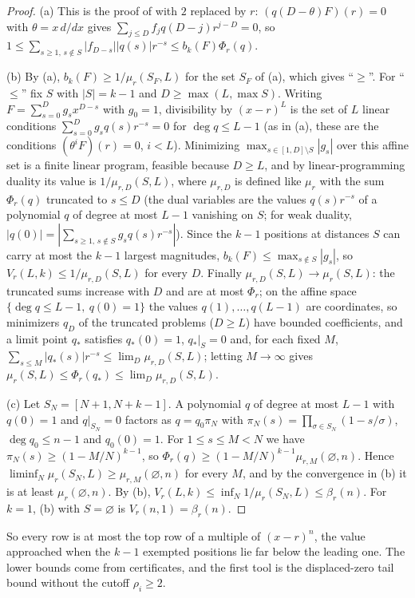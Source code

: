 \documentclass[11pt]{article}
\begin{document}
\begin{proof}
(a) This is the proof of \cite[Lemma~4.5]{coefficient-mass} with $2$ replaced by $r$:
$(q(D-\theta)F)(r)=0$ with $\theta=x\,d/dx$ gives
$\sum_{j\le D}f_jq(D-j)r^{j-D}=0$, so
$1\le\sum_{s\ge1,\,s\notin S}|f_{D-s}||q(s)|r^{-s}\le b_k(F)\Phi_r(q)$.

(b) By (a), $b_k(F)\ge1/\mu_r(S_F,L)$ for the set $S_F$ of (a), which
gives ``$\ge$''.  For ``$\le$'' fix $S$ with $|S|=k-1$ and $D\ge\max(L,\max S)$.
Writing $F=\sum_{s=0}^Dg_sx^{D-s}$ with $g_0=1$, divisibility by
$(x-r)^L$ is the set of $L$ linear conditions
$\sum_{s=0}^Dg_sq(s)r^{-s}=0$ for $\deg q\le L-1$ (as in (a), these are the
conditions $(\theta^iF)(r)=0$, $i<L$).  Minimizing
$\max_{s\in[1,D]\setminus S}|g_s|$ over this affine set is a finite linear
program, feasible because $D\ge L$, and by linear-programming duality its value is
$1/\mu_{r,D}(S,L)$, where $\mu_{r,D}$ is defined like $\mu_r$ with the sum
$\Phi_r(q)$ truncated to $s\le D$ (the dual variables are the values
$q(s)r^{-s}$ of a polynomial $q$ of degree at most $L-1$ vanishing on $S$;
for weak duality, $|q(0)|=|\sum_{s\ge1,\,s\notin S}g_sq(s)r^{-s}|$).  Since
the $k-1$ positions at distances $S$ can carry at most the $k-1$ largest
magnitudes, $b_k(F)\le\max_{s\notin S}|g_s|$, so
$V_r(L,k)\le1/\mu_{r,D}(S,L)$ for every $D$.  Finally
$\mu_{r,D}(S,L)\to\mu_r(S,L)$: the truncated sums increase with $D$ and
are at most $\Phi_r$; on the affine space $\{\deg q\le L-1,\ q(0)=1\}$ the
values $q(1),\ldots,q(L-1)$ are coordinates, so minimizers $q_D$ of the
truncated problems ($D\ge L$) have bounded coefficients, and a limit point
$q_*$ satisfies $q_*(0)=1$, $q_*|_S=0$ and, for each fixed $M$,
$\sum_{s\le M}|q_*(s)|r^{-s}\le\lim_D\mu_{r,D}(S,L)$; letting $M\to\infty$
gives $\mu_r(S,L)\le\Phi_r(q_*)\le\lim_D\mu_{r,D}(S,L)$.

(c) Let $S_N=[N+1,N+k-1]$.  A polynomial $q$ of degree at most $L-1$ with
$q(0)=1$ and $q|_{S_N}=0$ factors as $q=q_0\pi_N$ with
$\pi_N(s)=\prod_{\sigma\in S_N}(1-s/\sigma)$, $\deg q_0\le n-1$ and
$q_0(0)=1$.  For $1\le s\le M<N$ we have $\pi_N(s)\ge(1-M/N)^{k-1}$, so
$\Phi_r(q)\ge(1-M/N)^{k-1}\mu_{r,M}(\varnothing,n)$.  Hence
$\liminf_N\mu_r(S_N,L)\ge\mu_{r,M}(\varnothing,n)$ for every $M$, and by
the convergence in (b) it is at least $\mu_r(\varnothing,n)$.  By (b),
$V_r(L,k)\le\inf_N1/\mu_r(S_N,L)\le\beta_r(n)$.  For $k=1$, (b) with
$S=\varnothing$ is $V_r(n,1)=\beta_r(n)$.
\end{proof}

So every row is at most the top row of a multiple of $(x-r)^n$, the value
approached when the $k-1$ exempted positions lie far below the leading one.
The lower bounds come from certificates, and the first tool is the
displaced-zero tail bound without the cutoff $\rho_i\ge2$.
\end{document}
